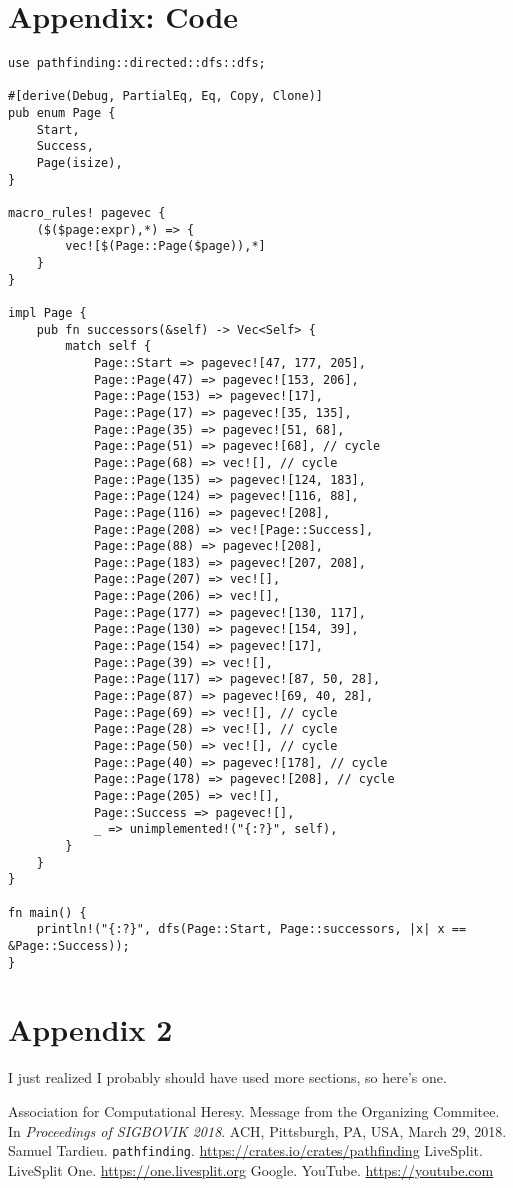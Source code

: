 \documentclass{article}
\begin{document}
\section{Appendix: Code}
\begin{verbatim}
use pathfinding::directed::dfs::dfs;

#[derive(Debug, PartialEq, Eq, Copy, Clone)]
pub enum Page {
    Start,
    Success,
    Page(isize),
}

macro_rules! pagevec {
    ($($page:expr),*) => {
        vec![$(Page::Page($page)),*]
    }
}

impl Page {
    pub fn successors(&self) -> Vec<Self> {
        match self {
            Page::Start => pagevec![47, 177, 205],
            Page::Page(47) => pagevec![153, 206],
            Page::Page(153) => pagevec![17],
            Page::Page(17) => pagevec![35, 135],
            Page::Page(35) => pagevec![51, 68],
            Page::Page(51) => pagevec![68], // cycle
            Page::Page(68) => vec![], // cycle
            Page::Page(135) => pagevec![124, 183],
            Page::Page(124) => pagevec![116, 88],
            Page::Page(116) => pagevec![208],
            Page::Page(208) => vec![Page::Success],
            Page::Page(88) => pagevec![208],
            Page::Page(183) => pagevec![207, 208],
            Page::Page(207) => vec![],
            Page::Page(206) => vec![],
            Page::Page(177) => pagevec![130, 117],
            Page::Page(130) => pagevec![154, 39],
            Page::Page(154) => pagevec![17],
            Page::Page(39) => vec![],
            Page::Page(117) => pagevec![87, 50, 28],
            Page::Page(87) => pagevec![69, 40, 28],
            Page::Page(69) => vec![], // cycle
            Page::Page(28) => vec![], // cycle
            Page::Page(50) => vec![], // cycle
            Page::Page(40) => pagevec![178], // cycle
            Page::Page(178) => pagevec![208], // cycle
            Page::Page(205) => vec![],
            Page::Success => pagevec![],
            _ => unimplemented!("{:?}", self),
        }
    }
}

fn main() {
    println!("{:?}", dfs(Page::Start, Page::successors, |x| x == &Page::Success));
}
\end{verbatim}

\section{Appendix 2}
I just realized I probably should have used more sections, so here's one.

\begin{thebibliography}{9}
        Association for Computational Heresy. Message from the Organizing Commitee. In \emph{Proceedings of SIGBOVIK 2018}. ACH, Pittsburgh, PA, USA, March 29, 2018.
        Samuel Tardieu. \texttt{pathfinding}. \url{https://crates.io/crates/pathfinding}
        LiveSplit. LiveSplit One. \url{https://one.livesplit.org}
        Google. YouTube. \url{https://youtube.com}
\end{thebibliography}
\end{document}
